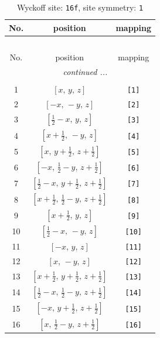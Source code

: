 \documentclass[fleqn,8pt]{jsarticle}
\begin{document}
\begin{longtable}{ccc}
\caption{Wyckoff site: {\tt 16f}, site symmetry: {\tt 1}}
 \\
 \hline \hline
No. & position & mapping \\ \hline \endfirsthead

\multicolumn{2}{l}{\tablename\ \thetable{}} \\
 \hline \hline
No. & position & mapping \\ \hline \endhead

 \hline \hline
\multicolumn{2}{r}{\footnotesize\it continued ...} \\ \endfoot

 \hline \hline
\multicolumn{2}{r}{} \\ \endlastfoot

1 & $\left[ x,\, y,\, z \right]$ & {\tt [1]} \\ \hline
2 & $\left[ - x,\, - y,\, z \right]$ & {\tt [2]} \\ \hline
3 & $\left[ \frac{1}{2} - x,\, y,\, z \right]$ & {\tt [3]} \\ \hline
4 & $\left[ x + \frac{1}{2},\, - y,\, z \right]$ & {\tt [4]} \\ \hline
5 & $\left[ x,\, y + \frac{1}{2},\, z + \frac{1}{2} \right]$ & {\tt [5]} \\ \hline
6 & $\left[ - x,\, \frac{1}{2} - y,\, z + \frac{1}{2} \right]$ & {\tt [6]} \\ \hline
7 & $\left[ \frac{1}{2} - x,\, y + \frac{1}{2},\, z + \frac{1}{2} \right]$ & {\tt [7]} \\ \hline
8 & $\left[ x + \frac{1}{2},\, \frac{1}{2} - y,\, z + \frac{1}{2} \right]$ & {\tt [8]} \\ \hline
9 & $\left[ x + \frac{1}{2},\, y,\, z \right]$ & {\tt [9]} \\ \hline
10 & $\left[ \frac{1}{2} - x,\, - y,\, z \right]$ & {\tt [10]} \\ \hline
11 & $\left[ - x,\, y,\, z \right]$ & {\tt [11]} \\ \hline
12 & $\left[ x,\, - y,\, z \right]$ & {\tt [12]} \\ \hline
13 & $\left[ x + \frac{1}{2},\, y + \frac{1}{2},\, z + \frac{1}{2} \right]$ & {\tt [13]} \\ \hline
14 & $\left[ \frac{1}{2} - x,\, \frac{1}{2} - y,\, z + \frac{1}{2} \right]$ & {\tt [14]} \\ \hline
15 & $\left[ - x,\, y + \frac{1}{2},\, z + \frac{1}{2} \right]$ & {\tt [15]} \\ \hline
16 & $\left[ x,\, \frac{1}{2} - y,\, z + \frac{1}{2} \right]$ & {\tt [16]} \\
\end{longtable}
\end{document}
